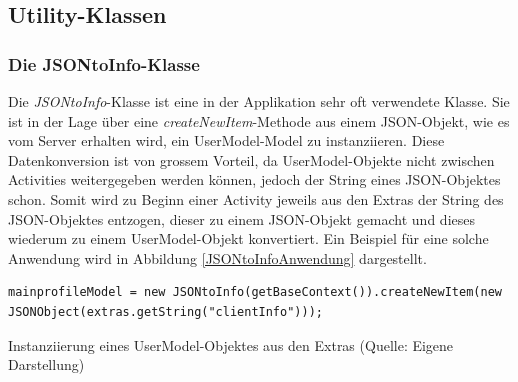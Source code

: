 \documentclass[../main.tex]{subfiles}
\begin{document}
	
	\subsection{Utility-Klassen}
	\subsubsection{Die JSONtoInfo-Klasse}
	Die \emph{JSONtoInfo}-Klasse ist eine in der Applikation sehr oft verwendete Klasse. Sie ist in der Lage über eine \emph{createNewItem}-Methode aus einem JSON-Objekt, wie es vom Server erhalten wird, ein UserModel-Model zu instanziieren. Diese Datenkonversion ist von grossem Vorteil, da UserModel-Objekte nicht zwischen Activities weitergegeben werden können, jedoch der String eines JSON-Objektes schon. Somit wird zu Beginn einer Activity jeweils aus den Extras der String des JSON-Objektes entzogen, dieser zu einem JSON-Objekt gemacht und dieses wiederum zu einem UserModel-Objekt konvertiert. Ein Beispiel für eine solche Anwendung wird in Abbildung \ref{JSONtoInfoAnwendung} dargestellt.
	
\begin{code}
	\begin{center}
		\begin{verbatim}
mainprofileModel = new JSONtoInfo(getBaseContext()).createNewItem(new JSONObject(extras.getString("clientInfo")));			
		\end{verbatim}
		\caption{Instanziierung eines UserModel-Objektes aus den Extras (Quelle: Eigene Darstellung)}
		\label{JSONtoInfoAnwendung}
	\end{center}
\end{code}
	
\end{document}
